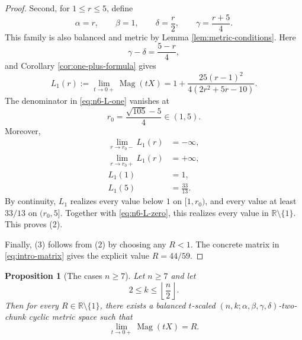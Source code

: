 \documentclass[11pt]{amsart}
\numberwithin{equation}{section}
\newtheorem{proposition}[theorem]{Proposition}
\theoremstyle{definition}
\theoremstyle{remark}
\DeclareMathOperator{\Mag}{Mag}
\newcommand{\R}{\mathbb{R}}
\begin{document}
\begin{proof}
Second, for \(1\leq r\leq 5\), define
\begin{equation}\label{eq:n6-family-one}
\alpha=r,
\qquad
\beta=1,
\qquad
\delta=\frac{r}{2},
\qquad
\gamma=\frac{r+5}{4}.
\end{equation}
This family is also balanced and metric by Lemma \ref{lem:metric-conditions}.  Here
\begin{equation}\label{eq:n6-family-one-eta}
\gamma-
\delta=\frac{5-r}{4},
\end{equation}
and Corollary \ref{cor:one-plus-formula} gives
\begin{equation}\label{eq:n6-L-one}
L_1(r)
:=\lim_{t\to 0+}\Mag(tX)
=1+\frac{25(r-1)^2}{4(2r^2+5r-10)}.
\end{equation}
The denominator in \eqref{eq:n6-L-one} vanishes at
\begin{equation}\label{eq:n6-root}
r_0=\frac{\sqrt{105}-5}{4}\in(1,5).
\end{equation}
Moreover,
\begin{align}
\lim_{r\to r_0-}L_1(r)&=-\infty,
\label{eq:n6-negative-infinity}\\
\lim_{r\to r_0+}L_1(r)&=+\infty,
\label{eq:n6-positive-infinity}\\
L_1(1)&=1,
\label{eq:n6-L-one-at-one}\\
L_1(5)&=\frac{33}{13}.
\label{eq:n6-L-one-at-five}
\end{align}
By continuity, \(L_1\) realizes every value below \(1\) on \([1,r_0)\), and every value at least \(33/13\) on \((r_0,5]\).  Together with \eqref{eq:n6-L-zero}, this realizes every value in \(\R\setminus\{1\}\).  This proves \textup{(2)}.

Finally, \textup{(3)} follows from \textup{(2)} by choosing any \(R<1\).  The concrete matrix in \eqref{eq:intro-matrix} gives the explicit value \(R=44/59\).
\end{proof}

\begin{proposition}[The cases \(n\geq 7\)]\label{prop:n-geq-seven}
Let \(n\geq 7\) and let
\begin{equation}\label{eq:n-geq-seven-k-condition}
2\leq k\leq \left\lfloor\frac{n}{2}\right\rfloor.
\end{equation}
Then for every \(R\in\R\setminus\{1\}\), there exists a balanced \(t\)-scaled \((n,k;\alpha,\beta,\gamma,\delta)\)-two-chunk cyclic metric space such that
\begin{equation}\label{eq:n-geq-seven-arbitrary-R}
\lim_{t\to 0+}\Mag(tX)=R.
\end{equation}
\end{proposition}
\end{document}
